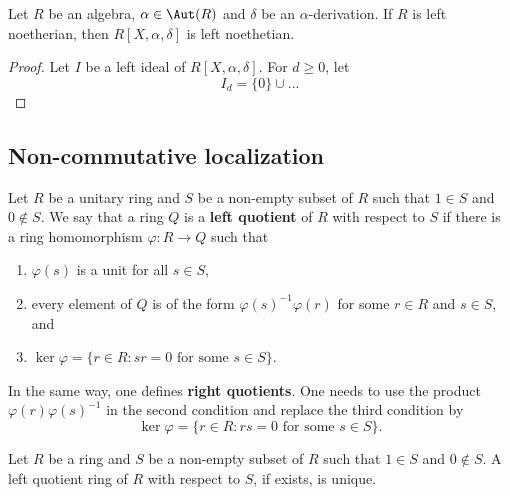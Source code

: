 \begin{theorem}
    Let $R$ be an algebra, $\alpha\in\Aut(R)$ and $\delta$ be an $\alpha$-derivation. If $R$ 
    is left noetherian, then $R[X,\alpha,\delta]$ is left noethetian. 
\end{theorem}

\begin{proof}
    Let $I$ be a left ideal of $R[X,\alpha,\delta]$. For $d\geq0$, let 
    \[
    I_d=\{0\}\cup...
    \]
\end{proof}

\subsection{Non-commutative localization}

\begin{definition}
    Let $R$ be a unitary ring and $S$ be a non-empty subset of $R$ such that 
    $1\in S$ and $0\not\in S$. We say that a ring $Q$ is a 
    \textbf{left quotient} of $R$ with respect to $S$ if there is 
    a ring homomorphism $\varphi\colon R\to Q$ such that
    \begin{enumerate}
        \item $\varphi(s)$ is a unit for all $s\in S$, 
        \item every element of $Q$ is of the form $\varphi(s)^{-1}\varphi(r)$ 
        for some $r\in R$ and $s\in S$, and 
        \item $\ker\varphi=\{r\in R:sr=0\text{ for some $s\in S$}\}$. 
    \end{enumerate}
\end{definition}

In the same way, one defines \textbf{right quotients}. One needs to use 
the product $\varphi(r)\varphi(s)^{-1}$ in the second condition and 
replace the third condition 
by 
\[
\ker\varphi=\{r\in R:rs=0\text{ for some $s\in S$}\}. 
\]  

\begin{exercise}
    Let $R$ be a ring and $S$ be a non-empty subset of $R$ such that 
    $1\in S$ and $0\not\in S$. A left quotient ring of $R$ with respect to $S$, if exists, is unique. 
\end{exercise}


